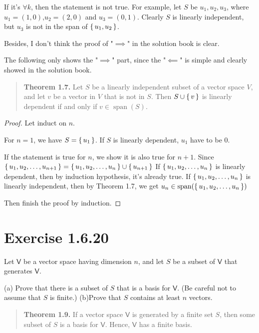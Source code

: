 \documentclass{article}
\newcommand{\0}{\mathit{0}}
\begin{document}
If it's $\forall k$, then the statement is not true. For example,
let $S$ be ${u_1,u_2,u_3}$, where
$u_1=(1,0)$,$u_2=(2,0)$ and $u_3=(0,1)$.
Clearly $S$ is linearly independent, but $u_3$ is not in the span of $\set{u_1,u_2}$.

Besides, I don't think the proof of "$\implies$" in the solution book is clear.

The following only shows the "$\implies$" part,
since the "$\impliedby$"
is simple and clearly showed in the solution book.

\begin{quotation}
    \textbf{Theorem 1.7.} Let $S$ be a linearly independent subset of a vector space
    $V$, and let $v$ be a vector in $V$ that is not in $S$. Then $S \cup \set{v}$
    is linearly dependent if and only if $v \in \operatorname{span}(S)$.
\end{quotation}

\begin{proof}
    Let induct on $n$.

    For $n=1$, we have $S=\set{u_1}$. If $S$ is linearly dependent, $u_1$ have to be $\0$.

    If the statement is true for $n$, we show it is also true for $n+1$.
    Since $\set{u_1,u_2,\dots,u_{n+1}}=\set{u_1,u_2,\dots,u_n}\cup\set{u_{n+1}}$
    If $\set{u_1,u_2,\dots,u_n}$ is linearly dependent, then by induction hypothesis,
    it's already true.
    If $\set{u_1,u_2,\dots,u_n}$ is linearly independent, then by Theorem 1.7, we get
    $u_n\in\operatorname{span}(\set{u_1,u_2,\dots,u_n})$

    Then finish the proof by induction.
\end{proof}

\section{Exercise 1.6.20}
Let $\mathsf{V}$ be a vector space having dimension $n$, and let $S$
be a subset of $\mathsf{V}$ that generates $\mathsf{V}$.

(a) Prove that there is a subset of $S$ that is a basis for $\mathsf{V}$.
(Be careful not to assume that $S$ is finite.)
(b)Prove that $S$ contains at least $n$ vectors.

\begin{quotation}
    \textbf{Theorem 1.9.} If a vector space $\mathsf{V}$ is generated by a finite set $S$, then
    some subset of $S$ is a basis for $\mathsf{V}$. Hence, $\mathsf{V}$
    has a finite basis.
\end{quotation}
\end{document}
